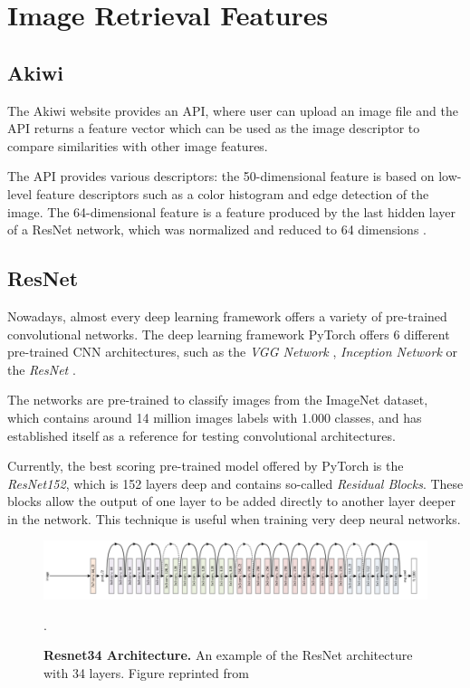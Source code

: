 \documentclass[12pt]{report}
\begin{document}
\pagebreak
\section{Image Retrieval Features}

\subsection{Akiwi}
The Akiwi website \cite{sonnenberg_akiwi_nodate} provides an API, where user can upload an image file and the API returns a feature vector which can be used as the image descriptor to compare similarities with other image features.

The API provides various descriptors: the 50-dimensional feature is based on low-level feature descriptors such as a color histogram and edge detection of the image. The 64-dimensional feature is a feature produced by the last hidden layer of a ResNet network, which was normalized and reduced to 64 dimensions \cite{Barthel:2017:VBM:3078971.3079016}.


\subsection{ResNet}
Nowadays, almost every deep learning framework offers a variety of pre-trained convolutional networks. The deep learning framework PyTorch offers 6 different pre-trained CNN architectures, such as the \textit{VGG Network} \cite{simonyan_very_2014}, \textit{Inception Network} \cite{szegedy_rethinking_2015} or the \textit{ResNet} \cite{he_deep_2015}. 

The networks are pre-trained to classify images from the ImageNet dataset, which contains around 14 million images labels with 1.000 classes, and has established itself as a reference for testing convolutional architectures. 

Currently, the best scoring pre-trained model offered by PyTorch is the \textit{ResNet152}, which is 152 layers deep and contains so-called \textit{Residual Blocks}. These blocks allow the output of one layer to be added directly to another layer deeper in the network. This technique is useful when training very deep neural networks.

\begin{figure}[h]
\centering
{\includegraphics[width=\linewidth]{02_background/CBIR/resnet_arch}}
\caption{\label{fig:search_pink} \textbf{Resnet34 Architecture.} An example of the ResNet architecture with 34 layers. Figure reprinted from \cite{noauthor_resnet-152_nodate}}.
\end{figure}
\end{document}
